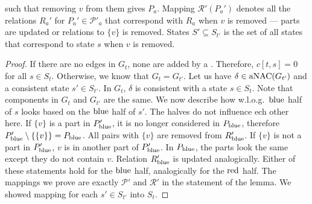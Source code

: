such that removing \( v \) from them gives \( P_a \).
Mapping \( \mathcal{R'}(P_a') \) denotes all the relations \( R_a' \)
for \( P_a' \in \mathcal{P'}_a \) that correspond with \( R_a \) when \( v \) is removed
--- parts are updated or relations to \( \{v\} \) is removed.
States \( S' \subseteq S_{t'} \) is the set of all states that
correspond to state \( s \) when \( v \) is removed.
%
\begin{proof}
	If there are no edges in \( G_t \), none are added by a \ForgetVertexNode{}.
	Therefore, \( c[t, s] = 0 \) for all \( s \in S_t \).
	Otherwise, we know that \( G_t = G_{t'} \).
	Let us have \( \delta \in \operatorname{aNAC}(G_{t'}) \)
	and a consistent state \( s' \in S_{t'} \).
	In \( G_t \), \( \delta \) is consistent with a state \( s \in S_t \).
	Note that components in \( G_t \) and \( G_{t'} \) are the same.
	We now describe how w.l.o.g.\ \( \text{blue} \) half of \( s \) looks
	based on the \( \text{blue} \) half of \( s' \).
	The halves do not influence ech other here.
	If \( \{v\} \) is a part in \( P_{\text{blue}}' \),
	it is no longer considered in \( P_{\text{blue}} \),
	therefore \( P_{\text{blue}}' \setminus \{\{v\}\} = P_{\text{blue}} \).
	All pairs with \( \{v\} \) are removed from \( R_{\text{blue}}' \).
	If \( \{v\} \) is not a part in \( P_{\text{blue}}' \),
	\( v \) is in another part of \( P_{\text{blue}}' \).
	In \( P_{\text{blue}} \), the parts look the same except they do not
	contain \( v \). Relation \( R_{\text{blue}}' \) is updated analogically.
	Either of these statements hold for the \( \text{blue} \) half,
	analogically for the \( \text{red} \) half.
	The mappings we prove are exactly \( \mathcal{P'} \) and \( \mathcal{R'} \)
	in the statement of the lemma.
	We showed mapping for each \( s' \in S_{t'} \) into \( S_t \).
\end{proof}
%

\subsubsection*{\IntroduceEdgeNode{}}

